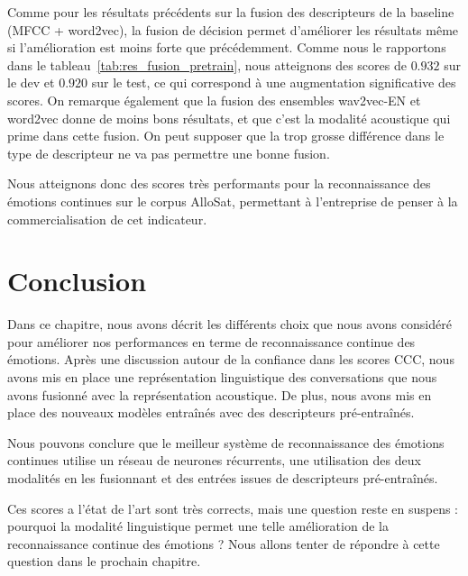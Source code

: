 

Comme pour les résultats précédents sur la fusion des descripteurs de la baseline (MFCC + word2vec), la fusion de décision permet d'améliorer les résultats même si l'amélioration est moins forte que précédemment. Comme nous le rapportons dans le tableau~\ref{tab:res_fusion_pretrain}, nous atteignons des scores de $0.932$ sur le dev et $0.920$ sur le test, ce qui correspond à une augmentation significative des scores. On remarque également que la fusion des ensembles wav2vec-EN et word2vec donne de moins bons résultats, et que c'est la modalité acoustique qui prime dans cette fusion. On peut supposer que la trop grosse différence dans le type de descripteur ne va pas permettre une bonne fusion.

Nous atteignons donc des scores très performants pour la reconnaissance des émotions continues sur le corpus AlloSat, permettant à l'entreprise de penser à la commercialisation de cet indicateur.

\section{Conclusion}
Dans ce chapitre, nous avons décrit les différents choix que nous avons considéré pour améliorer nos performances en terme de reconnaissance continue des émotions. Après une discussion autour de la confiance dans les scores CCC, nous avons mis en place une représentation linguistique des conversations que nous avons fusionné avec la représentation acoustique. De plus, nous avons mis en place des nouveaux modèles entraînés avec des descripteurs pré-entraînés.

Nous pouvons conclure que le meilleur système de reconnaissance des émotions continues utilise un réseau de neurones récurrents, une utilisation des deux modalités en les fusionnant et des entrées issues de descripteurs pré-entraînés.

Ces scores a l'état de l'art sont très corrects, mais une question reste en suspens : pourquoi la modalité linguistique permet une telle amélioration de la reconnaissance continue des émotions ? Nous allons tenter de répondre à cette question dans le prochain chapitre.
